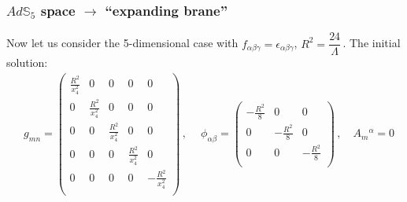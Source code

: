 \documentclass[12pt, utf8]{article}
\numberwithin{equation}{section}
\begin{document}
\subsubsection{$Ad\mathbb{S}_5$ space $\to$ ``expanding brane''}

Now let us consider the 5-dimensional case with $f_{\alpha \beta \gamma} = \epsilon_{\alpha \beta \gamma} $, $R^2 = \dfrac{24}{\Lambda} \,$. The initial solution: 
\begin{equation}
    \begin{aligned}
  &  g_{m n} =     \left(
\begin{array}{ccccc}
 \frac{R^2}{x_4^2} & 0 & 0 & 0 & 0 \\
 0 & \frac{R^2}{x_4^2} & 0 & 0 & 0 \\
 0 & 0 & \frac{R^2}{x_4^2} & 0 & 0 \\
 0 & 0 & 0 & \frac{R^2}{x_4^2} & 0 \\
 0 & 0 & 0 & 0 & -\frac{R^2}{x_4^2} \\
\end{array}
\right) \, , \quad\ \phi_{\alpha \beta} = \left(
\begin{array}{ccc}
 -\frac{R^2}{8} & 0 & 0 \\
 0 & -\frac{R^2}{8} & 0 \\
 0 & 0 & -\frac{R^2}{8} \\
\end{array}
\right) \, ,  
\quad A_{m}{}^{\alpha} = 0
    \end{aligned}
\end{equation}
\end{document}
